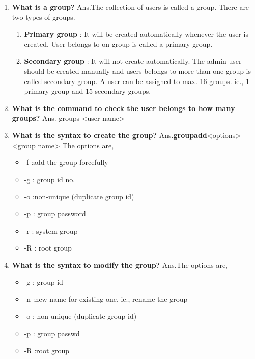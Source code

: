 \begin{enumerate}
    \bigskip
    \bigskip

    \item\textbf{What is a group?}
    \newline
    Ans.The collection of users is called a group. There are two types of groups.
     \begin{enumerate}
          \item\textbf{Primary group} : It will be created automatically whenever the user is created. User belongs to on group is called a  primary group.
          \item\textbf{Secondary group} :  It will not create automatically. The admin user should be created manually and users belongs to more than one group is called secondary group. A user can be assigned to max. 16 groups. ie., 1 primary group and 15 secondary groups.
     \end{enumerate}

    \bigskip
    \bigskip

    \item\textbf{What is the command to check the user belongs to how many groups?}
    \newline
    Ans. groups     <user name>

     \bigskip
     \bigskip

    \item\textbf{What is the syntax to create the group?}
    \newline
    Ans.\textbf{groupadd}<options><group name>
    The options are,\begin{itemize}
                       \item -f :add the group forcefully
                       \item -g : group id no.
                       \item -o :non-unique  (duplicate group id)
                       \item -p : group password
                       \item -r : system group
                       \item -R : root group  
                    \end{itemize}

    \bigskip
    \bigskip
    
    \item\textbf{What is the syntax to modify the group?}
    \newline
    Ans.The options are,\begin{itemize}
                          \item -g : group id
                          \item-n :new name for existing one, ie., rename the group
                          \item-o : non-unique  (duplicate group id)
                          \item-p : group passwd
                          \item-R :root group
                        \end{itemize}


\end{enumerate}
